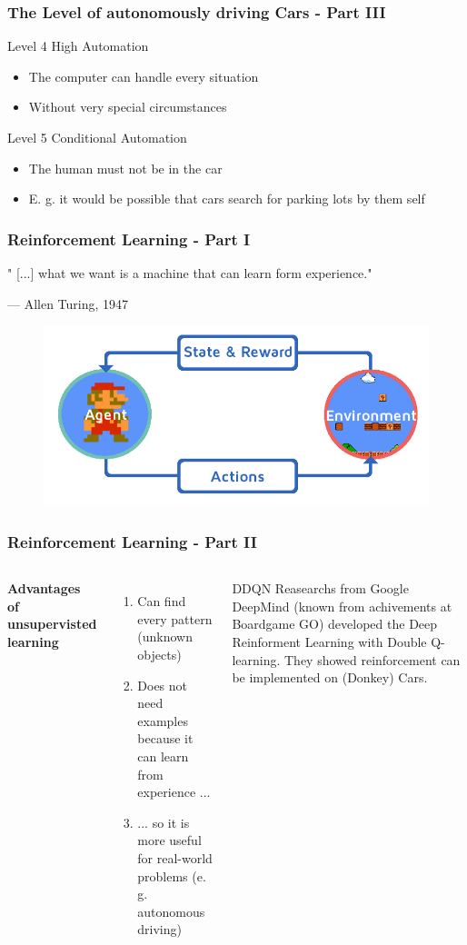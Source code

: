 \documentclass{beamer}
\begin{document}
\begin{frame}
\frametitle{The Level of autonomously driving Cars - Part III}
\begin{block}{Level 4}
High Automation
\begin{itemize}
\item The computer can handle every situation 
\item Without very special circumstances
\end{itemize}
\end{block}
\begin{block}{Level 5}
Conditional Automation
\begin{itemize}
\item The human must not be in the car
\item E. g. it would be possible that cars search for parking lots by them self
\end{itemize}
\end{block}
\end{frame}
%
%
\begin{frame}
\frametitle{Reinforcement Learning - Part I}
\epigraph{ " [...] what we want is a machine that can learn form experience."}{--- \textup{ Allen Turing}, 1947}
\begin{figure}
\includegraphics[width=0.6\linewidth]{photo/rl}
\end{figure}
\end{frame}
%
%
\begin{frame}
\frametitle{Reinforcement Learning - Part II}
\begin{columns}[c] %
\textbf{Advantages of unsupervisted learning}
\begin{enumerate}
\item Can find every pattern (unknown objects)
\item Does not need examples because it can learn from experience ...
\item ... so it is more useful for real-world problems (e. g. autonomous driving)
\end{enumerate}
\begin{block}{DDQN}
Reasearchs from Google DeepMind (known from achivements at Boardgame GO) developed the Deep Reinforment Learning with Double Q-learning. They showed reinforcement can be implemented on (Donkey) Cars. 
\end{block}
\end{columns}
\end{frame}
\end{document}
